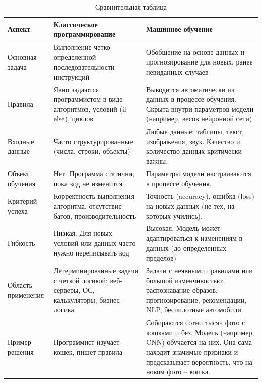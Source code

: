 \begin{table}[h]
    \centering
    \begin{tabular}{>{\raggedright\arraybackslash}p{}
        | >{\raggedright\arraybackslash}p{} | >{\raggedright\arraybackslash}p{}}
        \toprule
        \textbf{Аспект} & \textbf{Классическое программирование} & \textbf{Машинное обучение} \\
        \midrule
        Основная задача & Выполнение четко определенной последовательности инструкций & Обобщение на основе данных
        и прогнозирование для новых, ранее невиданных случаев \\ \hline
        Правила & Явно задаются программистом в виде алгоритмов, условий (if-else), циклов & Выводится автоматически
        из данных в процессе обучения.
        Скрыта внутри параметров модели (например, весов нейронной сети) \\ \hline
        Входные данные & Часто структурированные (числа, строки, объекты) & Любые данные: таблицы, текст,
        изображения, звук.
        Качество и количество данных критически важны. \\ \hline
        Объект обучения & Нет.
        Программа статична, пока код не изменится & Параметры модели настраиваются в процессе обучения. \\ \hline
        Критерий успеха & Корректность выполнения алгоритма, отсутствие багов, производительность & Точность
        (accuracy), ошибка (loss) на новых данных (не тех, на которых учились). \\ \hline
        Гибкость & Низкая.
        Для новых условий или данных часто нужно переписывать код & Высокая.
        Модель может адаптироваться к изменениям в данных (до определенных пределов) \\ \hline
        Область применения & Детерминированные задачи с четкой логикой: веб-серверы, ОС, калькуляторы,
        бизнес-логика & Задачи с неявными правилами или большой изменчивостью: распознавание образов,
        прогнозирование, рекомендации, NLP, беспилотные автомобили \\ \hline
        Пример решения & Программист изучает кошек, пишет правила & Собираются сотни тысяч фото с кошками и
        без.
        Модель (например, CNN) обучается на них.
        Она сама находит значимые признаки и предсказывает вероятность, что на новом фото -- кошка. \\
        \bottomrule
    \end{tabular}
    \caption{Сравнительная таблица}
    \label{tab:comp}
\end{table}

